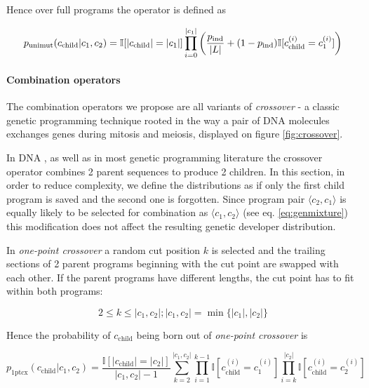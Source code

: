 Hence over full programs the operator is defined as

\begin{equation}
    p_\text{unimut}(c_\text{child}|c_1,c_2) = \mathbb{I}[|c_\text{child}|=|c_1|] \\ 
    \prod\limits_{i=0}^{|c_1|}  \left(\frac{p_\text{ind}}{|L|} +  (1 - p_\text{ind}) \mathbb{I}[c_\text{child}^{(i)} = c_1^{(i)}] \right)
\end{equation}

\paragraph{Combination operators}

The combination operators we propose are all variants of \emph{crossover} - a classic genetic programming technique rooted in the way a pair of DNA molecules exchanges genes during mitosis and meiosis, displayed on figure \ref{fig:crossover}.

In DNA \cite{evocritique}, as well as in most genetic programming literature \cite{genprog1,genprog2} the crossover operator combines 2 parent sequences to produce 2 children.
In this section, in order to reduce complexity, we define the distributions as if only the first child program is saved and the second one is forgotten.
Since program pair $\langle c_2, c_1 \rangle$ is equally likely to be selected for combination as $\langle c_1, c_2 \rangle$ (see eq. \ref{eq:genmixture}) this modification does not affect the resulting genetic developer distribution.

In \emph{one-point crossover} a random cut position $k$ is selected and the trailing sections of 2 parent programs beginning with the cut point are swapped with each other. 
If the parent programs have different lengths, the cut point has to fit within both programs:

\begin{equation}
    2 \leq k \leq |c_1,c_2|; |c_1,c_2| = \min\{|c_1|, |c_2|\}
\end{equation}

Hence the probability of $c_\text{child}$ being born out of \emph{one-point crossover} is

\begin{equation}
    p_\text{1ptcx}(c_\text{child}|c_1,c_2) =
        \frac{\mathbb{I}[|c_\text{child}|=|c_2|]}{|c_1,c_2|-1}
        \sum\limits_{k=2}^{|c_1,c_2|} \prod\limits_{i=1}^{k-1} \mathbb{I}[c_\text{child}^{(i)} = c_1^{(i)}] \prod\limits_{i=k}^{|c_2|} \mathbb{I}[c_\text{child}^{(i)} = c_2^{(i)}]
\end{equation}

